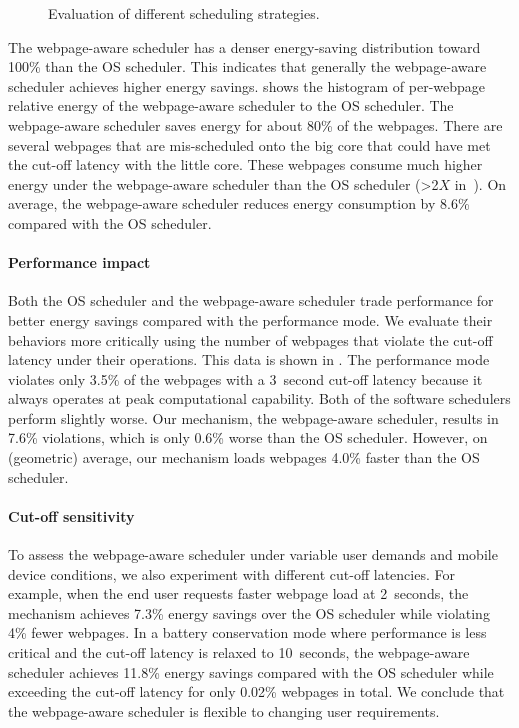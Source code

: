 \begin{figure}[t]
\hspace*{0.15pt}
\caption{\small Evaluation of different scheduling strategies.}
\label{fig:sched_results}
\end{figure}

The webpage-aware scheduler has a denser energy-saving distribution toward 100\% than the OS scheduler. This indicates that generally the webpage-aware scheduler achieves higher energy savings.  shows the histogram of per-webpage relative energy of the webpage-aware scheduler to the OS scheduler. The webpage-aware scheduler saves energy for about 80\% of the webpages. There are several webpages that are mis-scheduled onto the big core that could have met the cut-off latency with the little core. These webpages consume much higher energy under the webpage-aware scheduler than the OS scheduler (\textgreater 2$X$ in~).  On average, the webpage-aware scheduler reduces energy consumption by 8.6\% compared with the OS scheduler.

\paragraph{Performance impact} Both the OS scheduler and the webpage-aware scheduler trade performance for better energy savings compared with the performance mode. We evaluate their behaviors more critically using the number of webpages that violate the cut-off latency under their operations. This data is shown in . The performance mode violates only 3.5\% of the webpages with a 3~second cut-off latency because it always operates at peak computational capability. Both of the software schedulers perform slightly worse. Our mechanism, the webpage-aware scheduler, results in 7.6\% violations, which is only 0.6\% worse than the OS scheduler. However, on (geometric) average, our mechanism loads webpages 4.0\% faster than the OS scheduler.

\paragraph{Cut-off sensitivity} To assess the webpage-aware scheduler under variable user demands and mobile device conditions, we also experiment with different cut-off latencies. For example, when the end user requests faster webpage load at 2~seconds, the mechanism achieves 7.3\% energy savings over the OS scheduler while violating 4\% fewer webpages. In a battery conservation mode where performance is less critical and the cut-off latency is relaxed to 10~seconds, the webpage-aware scheduler achieves 11.8\% energy savings compared with the OS scheduler while exceeding the cut-off latency for only 0.02\% webpages in total. We conclude that the webpage-aware scheduler is flexible to changing user requirements.

